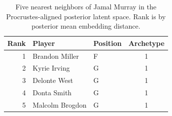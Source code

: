 \begin{table}[htbp]
  \centering\small
  \begin{tabular}{rllc}
    \toprule
    Rank & Player & Position & Archetype \\
    \midrule
    1 & Brandon Miller & F & 1 \\
    2 & Kyrie Irving & G & 1 \\
    3 & Delonte West & G & 1 \\
    4 & Donta Smith & G & 1 \\
    5 & Malcolm Brogdon & G & 1 \\
    \bottomrule
  \end{tabular}
  \caption{Five nearest neighbors of Jamal Murray in the Procrustes-aligned posterior latent space. Rank is by posterior mean embedding distance.}
  \label{tab:Jamal_Murray_neighbors}
\end{table}


